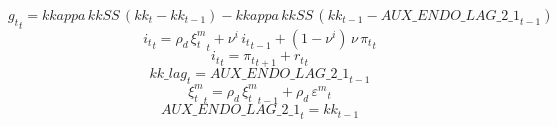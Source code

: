 \begin{dmath}
{g_t}_{t}={kkappa}\, {kkSS}\, \left({kk}_{t}-{kk}_{t-1}\right)-{kkappa}\, {kkSS}\, \left({kk}_{t-1}-{AUX\_ENDO\_LAG\_2\_1}_{t-1}\right)
\end{dmath}
\begin{dmath}
{i_t}_{t}={\rho_d}\, {\xi^m_t}_{t}+{\nu^i}\, {i_t}_{t-1}+\left(1-{\nu^i}\right)\, {\nu}\, {\pi_t}_{t}
\end{dmath}
\begin{dmath}
{i_t}_{t}={\pi_t}_{t+1}+{r_t}_{t}
\end{dmath}
\begin{dmath}
{kk\_lag}_{t}={AUX\_ENDO\_LAG\_2\_1}_{t-1}
\end{dmath}
\begin{dmath}
{\xi^m_t}_{t}={\rho_d}\, {\xi^m_t}_{t-1}+{\rho_d}\, {{\varepsilon^{m}}}_{t}
\end{dmath}
\begin{dmath}
{AUX\_ENDO\_LAG\_2\_1}_{t}={kk}_{t-1}
\end{dmath}
